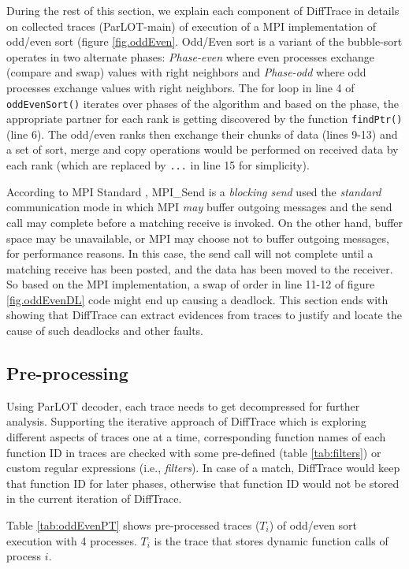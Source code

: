 During the rest of this section, we explain each component of DiffTrace in details on collected traces (ParLOT-main) of execution of a MPI implementation of odd/even sort (figure \ref{fig.oddEven}.
Odd/Even sort is a variant of the bubble-sort operates in two alternate phases: \textit{Phase-even} where even processes exchange (compare and swap) values with right neighbors and \textit{Phase-odd} where odd processes exchange values with right neighbors. The for loop in line 4 of \texttt{oddEvenSort()} iterates over phases of the algorithm and based on the phase, the appropriate partner for each rank is getting discovered by the function \texttt{findPtr()} (line 6). The odd/even ranks then exchange their chunks of data (lines 9-13) and a set of sort, merge and copy operations would be performed on received data by each rank (which are replaced by \texttt{...} in line 15 for simplicity).

According to MPI Standard , MPI\_Send is a \textit{blocking send} used the \textit{standard} communication mode in which MPI \textit{may} buffer outgoing messages and the send call may complete before a matching receive is invoked. On the other hand, buffer space may be unavailable, or MPI may choose not to buffer outgoing messages, for performance reasons. In this case, the send call will not complete until a matching receive has been posted, and the data has been moved to the receiver. So based on the MPI implementation, a swap of order in line 11-12 of figure \ref{fig.oddEvenDL} code might end up causing a deadlock. This section ends with showing that DiffTrace can extract evidences from traces to justify and locate the cause of such deadlocks and other faults.


\subsection{Pre-processing}

Using ParLOT decoder, each trace needs to get decompressed for further analysis.
Supporting the iterative approach of DiffTrace which is exploring different aspects of traces one at a time, corresponding function names of each function ID in traces are checked with some pre-defined (table \ref{tab:filters}) or custom regular expressions (i.e., \textit{filters}). In case of a match, DiffTrace would keep that function ID for later phases, otherwise that function ID would not be stored in the current iteration of DiffTrace.

Table \ref{tab:oddEvenPT} shows pre-processed traces ($T_i$) of odd/even sort execution with 4 processes. $T_i$ is the trace that stores dynamic function calls of process $i$.



